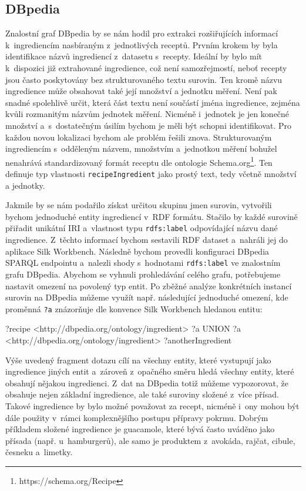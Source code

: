 \subsection{DBpedia}

Znalostní graf DBpedia by se nám hodil pro extrakci rozšiřujících informací k~ingrediencím nasbíraným z~jednotlivých receptů. Prvním krokem by byla identifikace názvů ingrediencí z~datasetu s~recepty. Ideální by bylo mít k~dispozici již extrahované ingredience, což není samozřejmostí, neboť recepty jsou často poskytovány bez strukturovaného textu surovin. Ten kromě názvu ingredience může obsahovat také její množství a jednotku měření. Není pak snadné spolehlivě určit, která část textu není součástí jména ingredience, zejména kvůli rozmanitým názvům jednotek měření. Nicméně i~jednotek je jen konečné množství a~s~dostatečným úsilím bychom je měli být schopni identifikovat. Pro každou novou lokalizaci bychom ale problém řešili znova. Strukturovaným ingrediencím s~odděleným názvem, množstvím a~jednotkou měření bohužel nenahrává standardizovaný formát receptu dle ontologie Schema.org\footnote{https://schema.org/Recipe}. Ten definuje typ vlastnosti \texttt{recipeIngredient} jako prostý text, tedy včetně množství a jednotky.

Jakmile by se nám podařilo získat určitou skupinu jmen surovin, vytvořili bychom jednoduché entity ingrediencí v~RDF formátu. Stačilo by každé surovině přiřadit unikátní IRI a~vlastnost typu \texttt{rdfs:label} odpovídající názvu dané ingredience. Z~těchto informací bychom sestavili RDF dataset a~nahráli jej do aplikace Silk Workbench. Následně bychom provedli konfiguraci DBpedia SPARQL endpointu a~nalezli shody s~hodnotami \texttt{rdfs:label} ve znalostním grafu DBpedia. Abychom se vyhnuli prohledávání celého grafu, potřebujeme nastavit omezení na povolený typ entit. Po zběžné analýze konkrétních instancí surovin na DBpedia můžeme využít např. následující jednoduché omezení, kde proměnná \texttt{?a} znázorňuje dle konvence Silk Workbench hledanou entitu:

\begin{code}
{ 
    {
        ?recipe <http://dbpedia.org/ontology/ingredient> ?a
    } UNION {
        ?a <http://dbpedia.org/ontology/ingredient> ?anotherIngredient
    } 
}
\end{code}

Výše uvedený fragment dotazu cílí na všechny entity, které vystupují jako ingredience jiných entit a~zároveň z~opačného směru hledá všechny entity, které obsahují nějakou ingredienci. Z~dat na DBpedia totiž můžeme vypozorovat, že obsahuje nejen základní ingredience, ale také suroviny složené z~více přísad. Takové ingredience by bylo možné považovat za recept, nicméně i~ony mohou být dále použity v~rámci komplexnějšího postupu přípravy pokrmu. Dobrým příkladem složené ingredience je guacamole, které bývá často uváděno jako přísada (např. u~hamburgerů), ale samo je produktem z~avokáda, rajčat, cibule, česneku a~limetky.

